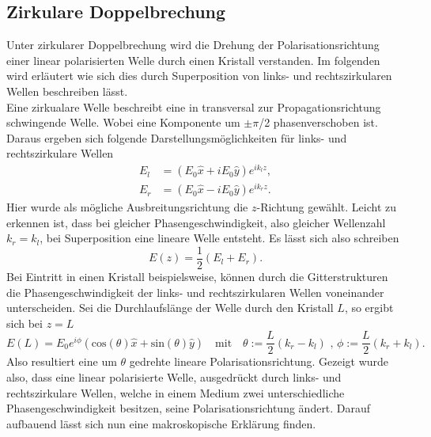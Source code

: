 \subsection{Zirkulare Doppelbrechung}

Unter zirkularer Doppelbrechung wird die Drehung der Polarisationsrichtung einer linear polarisierten Welle durch einen Kristall verstanden. 
Im folgenden wird erläutert wie sich dies durch Superposition von links- und rechtszirkularen Wellen beschreiben lässt.
\\
Eine zirkualare Welle beschreibt eine in transversal zur Propagationsrichtung schwingende Welle. Wobei eine Komponente um $\pm \pi$/2 phasenverschoben ist.
Daraus ergeben sich folgende Darstellungsmöglichkeiten für links- und rechtszirkulare Wellen
\begin{align*}
E_l &= (E_0 \hat{x} + i E_0 \hat{y}) e^{ik_l z}, \\
E_r &= (E_0 \hat{x} - i E_0 \hat{y}) e^{ik_r z}.
\end{align*}
Hier wurde als mögliche Ausbreitungsrichtung die $z$-Richtung gewählt. Leicht zu erkennen ist, dass bei gleicher Phasengeschwindigkeit, also gleicher Wellenzahl $k_r = k_l$, bei Superposition eine lineare Welle entsteht.
Es lässt sich also schreiben
\begin{equation*}
E(z) = \frac{1}{2} (E_l + E_r).
\end{equation*}
Bei Eintritt in einen Kristall beispielsweise, können durch die Gitterstrukturen die Phasengeschwindigkeit der links- und rechtszirkularen Wellen
voneinander unterscheiden. Sei die Durchlaufslänge der Welle durch den Kristall $L$, so ergibt sich bei $z=L$
\begin{equation*}
    E(L) = E_0 e^{i \phi} (\text{cos}(\theta)\hat{x} + \text{sin}(\theta) \hat{y} ) \quad \text{mit} \quad \theta := \frac{L}{2} (k_r - k_l) \text{ , } \phi := \frac{L}{2} (k_r + k_l).
\end{equation*}
Also resultiert eine um $\theta$ gedrehte lineare Polarisationsrichtung. Gezeigt wurde also, dass eine linear polarisierte Welle, ausgedrückt durch links- und 
rechtszirkulare Wellen, welche in einem Medium zwei
unterschiedliche Phasengeschwindigkeit besitzen, seine Polarisationsrichtung ändert.
Darauf aufbauend lässt sich nun eine makroskopische Erklärung finden.

